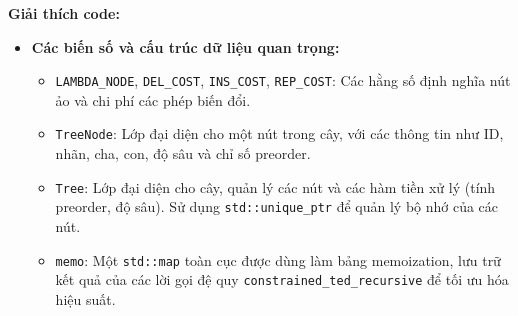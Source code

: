 \documentclass{article}
\begin{document}
\textbf{Giải thích code:}

\begin{itemize}
    \item \textbf{Các biến số và cấu trúc dữ liệu quan trọng:}
    \begin{itemize}
        \item \texttt{LAMBDA\_NODE}, \texttt{DEL\_COST}, \texttt{INS\_COST}, \texttt{REP\_COST}: Các hằng số định nghĩa nút ảo và chi phí các phép biến đổi.
        \item \texttt{TreeNode}: Lớp đại diện cho một nút trong cây, với các thông tin như ID, nhãn, cha, con, độ sâu và chỉ số preorder.
        \item \texttt{Tree}: Lớp đại diện cho cây, quản lý các nút và các hàm tiền xử lý (tính preorder, độ sâu). Sử dụng \texttt{std::unique\_ptr} để quản lý bộ nhớ của các nút.
        \item \texttt{memo}: Một \texttt{std::map} toàn cục được dùng làm bảng memoization, lưu trữ kết quả của các lời gọi đệ quy \texttt{constrained\_ted\_recursive} để tối ưu hóa hiệu suất.
    \end{itemize}


\end{itemize}
\end{document}
